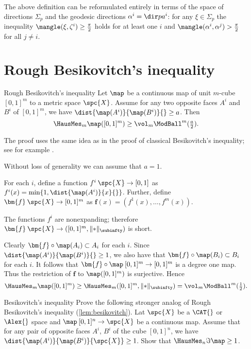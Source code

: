 The above definition can be reformulated entirely in terms of the space of directions $\Sigma_p$ and the geodesic directions $\alpha^i=\dir p{a^i}$: 
for any $\xi\in\Sigma_p$ 
the inequality $\mangle(\xi,\zeta^i)\ge\tfrac\pi2$ holds for at least one $i$
and $\mangle(\alpha^i,\alpha^j)>\tfrac\pi2$ for all $j\not=i$.












\section{Rough Besikovitch's inequality}


\begin{thm}{Rough Besikovitch's inequality}\label{lem:besikovitch}
Let  $\map$ be a continuous map of unit $m$-cube $[0,1]^m$ to a metric space $\spc{X}$.
Assume for any two opposite faces $A^i$ and $B^i$ of $[0,1]^m$,
we have $\dist{\map(A^i)}{\map(B^i)}{}\ge a$.
Then 
$$\HausMes_m\map([0,1]^m)\ge \vol_m\ModBall^m(\tfrac{a}{2}).$$

\end{thm}

The proof uses the same idea as in
the proof of classical Besikovitch's inequality;
see for example \cite[5.6.9]{BBI}.

Without loss of generality we can assume that $a=1$.

For each $i$,
define a function $f^i\: \spc{X}\to [0,1]$ 
as $f^i(x) = \min\{1, \dist{\map(A^i)}{x}{}\}$.
Further, define $\bm{f}\:\spc{X}\to[0,1]^m$
as
$\bm{f}(x) = (f^1(x),\dots, f^m(x))$. 

The functions $f^i$ are nonexpanding;
therefore $\bm{f}\:\spc{X}\to ([0,1]^m,\|{*}\|_\subinfty)$ is short.

Clearly
$\bm{f}\circ\map(A_i)\subset A_i$ for each $i$.
Since $\dist{\map(A^i)}{\map(B^i)}{}\ge 1$,
we also have that  $\bm{f}\circ\map(B_i)\subset B_i$ for each $i$. 
It follows that $\bm{f}\circ\map\:[0,1]^m\to [0,1]^m$ is a degree one map.
Thus the restriction of $\bm{f}$ to $\map([0,1]^m)$ is surjective.
Hence 
$$\HausMes_m\map([0,1]^m)\ge \HausMes_m([0,1]^m,\|{*}\|_\subinfty)=\vol_m\ModBall^m(\tfrac12).$$
\qedsf






\begin{thm}{Besikovitch's inequality}
Prove the following stronger analog of Rough Besikovitch's inequality (\ref{lem:besikovitch}).
Lat $\spc{X}$ be a $\CAT{}$ or $\Alex{}$ space and $\map\:[0,1]^n\to\spc{X}$ be a continuous map.
Assume that for any pair of opposite faces $A^i$, $B^i$ of the cube $[0,1]^n$, 
we have $\dist{\map(A^i)}{\map(B^i)}{\spc{X}}\ge 1$.
Show that $\HausMes_n\Im\map\ge 1$.
\end{thm}






